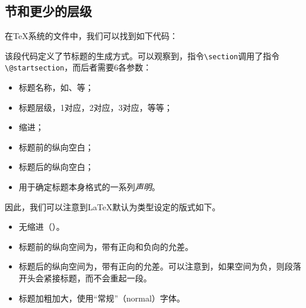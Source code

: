 \subsection{节和更少的层级}

在\TeX 系统的文件中，我们可以找到如下代码：


该段代码定义了节标题的生成方式。可以观察到，指令\verb|\section|调用了指令\verb|\@startsection|，而后者需要6各参数：

\begin{itemize}
    \item 标题名称，如、等；
    \item 标题层级，1对应，2对应，3对应，等等；
    \item 缩进；
    \item 标题前的纵向空白；
    \item 标题后的纵向空白；
    \item 用于确定标题本身格式的一系列\emph{声明}。
\end{itemize}

因此，我们可以注意到\LaTeX 默认为类型设定的版式如下。

\begin{itemize}
    \item 无缩进（\dm{0pt}）。
    \item 标题前的纵向空间为\dm{3.5ex}，带有正向\dm{-1ex}和负向\dm{-.2ex}的允差。
    \item 标题后的纵向空间为\dm{2.3ex}，带有正向\dm{.2ex}的允差。可以注意到，如果空间为负，则段落开头会紧接标题，而不会重起一段。
    \item 标题加粗加大，使用“常规”（normal）字体。
\end{itemize}

